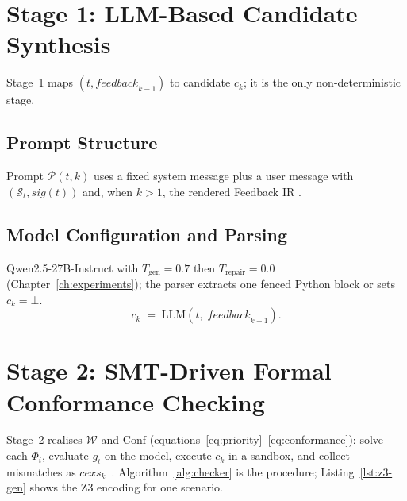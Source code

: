 \section{Stage 1: LLM-Based Candidate Synthesis}
\label{sec:method:synthesis}

Stage~1 maps $(t, \mathit{feedback}_{k-1})$ to candidate $c_k$; it is the only
non-deterministic stage.

\subsection{Prompt Structure}
\label{subsec:method:prompt}

Prompt $\mathcal{P}(t,k)$ uses a fixed system message plus a user message with
$(\mathcal{S}_t, \mathit{sig}(t))$ and, when $k>1$, the rendered Feedback IR
\citep{openai2023gpt4, chen2021codex}.

\subsection{Model Configuration and Parsing}
\label{subsec:method:model}

Qwen2.5-27B-Instruct with $T_\text{gen}=0.7$ then $T_\text{repair}=0.0$
(Chapter~\ref{ch:experiments}); the parser extracts one fenced Python block
or sets $c_k=\bot$.
\begin{equation}
  c_k \;=\; \mathrm{LLM}\!\left(t,\;\mathit{feedback}_{k-1}\right).
  \label{eq:synthesis}
\end{equation}

\section{Stage 2: SMT-Driven Formal Conformance Checking}
\label{sec:method:checker}

Stage~2 realises $\mathcal{W}$ and $\mathrm{Conf}$
(equations~\eqref{eq:priority}--\eqref{eq:conformance}):
solve each $\Phi_i$, evaluate $g_t$ on the model, execute $c_k$ in a sandbox,
and collect mismatches as $\mathit{cexs}_k$~\citep{demoura2008z3, barrett2018smt}.
Algorithm~\ref{alg:checker} is the procedure; Listing~\ref{lst:z3-gen} shows
the Z3 encoding for one scenario.


